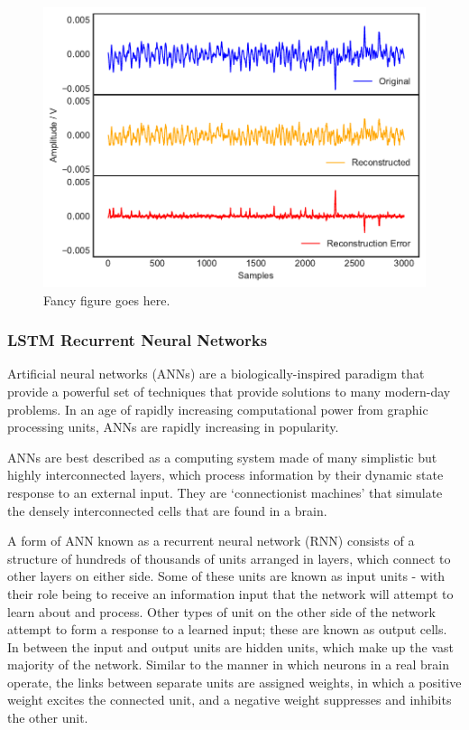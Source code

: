 \begin{figure}[t]
    \includegraphics[width=1.0\textwidth]{fig/kmeans.pdf}
    \caption[K mean clustering plot]{Fancy figure goes here.}
    \label{fig:kmeanerror}
\end{figure}

\subsubsection{LSTM Recurrent Neural Networks}
\label{subsec:LSTM}


Artificial neural networks (ANNs) are a biologically-inspired paradigm that provide a powerful set of techniques that provide solutions to many modern-day problems. In an age of rapidly increasing computational power from graphic processing units, ANNs are rapidly increasing in popularity.

ANNs are best described as a computing system made of many simplistic but highly interconnected layers, which process information by their dynamic state response to an external input. They are `connectionist machines' that simulate the densely interconnected cells that are found in a brain.

A form of ANN known as a recurrent neural network (RNN) consists of a structure of hundreds of thousands of units arranged in layers, which connect to other layers on either side. Some of these units are known as input units - with their role being to receive an information input that the network will attempt to learn about and process. Other types of unit on the other side of the network attempt to form a response to a learned input; these are known as output cells. In between the input and output units are hidden units, which make up the vast majority of the network. Similar to the manner in which neurons in a real brain operate, the links between separate units are assigned weights, in which a positive weight excites the connected unit, and a negative weight suppresses and inhibits the other unit.

